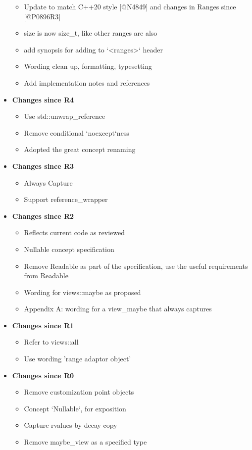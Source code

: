 \documentclass[a4paper,10pt,oneside,openany,final,article]{memoir}
\begin{document}
\begin{itemize}
\begin{itemize}
  \item Update to match C++20 style [@N4849] and changes in Ranges since [@P0896R3]
  \item size is now size_t, like other ranges are also
  \item add synopsis for adding to `<ranges>` header
  \item Wording clean up, formatting, typesetting
  \item Add implementation notes and references
  \end{itemize}
\item \textbf{Changes since R4}
  \begin{itemize}
  \item Use std::unwrap\_reference
  \item Remove conditional `noexcept`ness
  \item Adopted the great concept renaming
  \end{itemize}
\item \textbf{Changes since R3}
  \begin{itemize}
  \item Always Capture
  \item Support reference\_wrapper
  \end{itemize}
\item \textbf{Changes since R2}
  \begin{itemize}
  \item Reflects current code as reviewed
  \item Nullable concept specification
  \item Remove Readable as part of the specification, use the useful requirements from Readable
  \end{itemize}
  \begin{itemize}
  \item Wording for views::maybe as proposed
  \item Appendix A: wording for a view\_maybe that always captures
  \end{itemize}
\item \textbf{Changes since R1}
  \begin{itemize}
  \item Refer to views::all
  \item Use wording 'range adaptor object'
  \end{itemize}
\item \textbf{Changes since R0}
  \begin{itemize}
  \item Remove customization point objects
  \item Concept `Nullable`, for exposition
  \item Capture rvalues by decay copy
  \item Remove maybe\_view as a specified type
  \end{itemize}
\end{itemize}

\renewcommand{\bibname}{References}



\nocite{viewmayb27:online}
\end{document}

